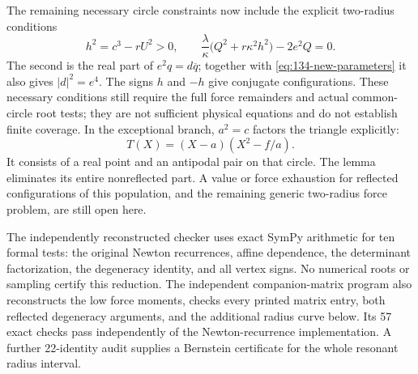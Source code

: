 \documentclass[11pt,a4paper]{article}
\theoremstyle{remark}
\begin{document}
The remaining necessary circle constraints now include the explicit
two-radius conditions
\[
 h^2=c^3-rU^2>0,\qquad
 \frac{\lambda}{\kappa}
       \bigl(Q^2+r\kappa^2h^2\bigr)-2e^2Q=0.
\]
The second is the real part of \(e^2q=d\overline q\); together with
\eqref{eq:134-new-parameters} it also gives \(|d|^2=e^4\).
The signs \(h\) and \(-h\) give conjugate configurations. These
necessary conditions still require the full force remainders and
actual common-circle root tests; they are not sufficient physical
equations and do not establish finite coverage.
In the exceptional branch, \(a^2=c\) factors the triangle explicitly:
\[
                  T(X)=(X-a)(X^2-f/a).
\]
It consists of a real point and an antipodal pair on that circle.
The lemma eliminates its entire nonreflected part. A value or force
exhaustion for reflected configurations of this population, and the
remaining generic two-radius force problem, are still open here.

The independently reconstructed checker
 uses exact SymPy arithmetic for ten
formal tests: the original Newton recurrences, affine dependence,
the determinant factorization, the degeneracy identity, and all
vertex signs. No numerical roots or sampling certify this reduction.
The independent companion-matrix program 
also reconstructs the low force moments, checks every printed matrix
entry, both reflected degeneracy arguments, and the additional
radius curve below. Its 57 exact checks pass independently of the
Newton-recurrence implementation. A further 22-identity audit supplies
a Bernstein certificate for the whole resonant radius interval.
\end{document}
